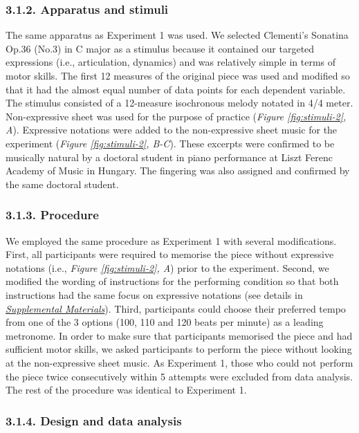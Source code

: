 \documentclass[
  english,
  man,floatsintext]{apa6}
\begin{document}
\hypertarget{apparatus-and-stimuli-1}{%
\subsubsection{3.1.2. Apparatus and stimuli}\label{apparatus-and-stimuli-1}}

The same apparatus as Experiment 1 was used. We selected Clementi's Sonatina Op.36 (No.3) in C major as a stimulus because it contained our targeted expressions (i.e., articulation, dynamics) and was relatively simple in terms of motor skills. The first 12 measures of the original piece was used and modified so that it had the almost equal number of data points for each dependent variable. The stimulus consisted of a 12-measure isochronous melody notated in 4/4 meter. Non-expressive sheet was used for the purpose of practice (\emph{Figure \ref{fig:stimuli-2}, A}). Expressive notations were added to the non-expressive sheet music for the experiment (\emph{Figure \ref{fig:stimuli-2}, B-C}). These excerpts were confirmed to be musically natural by a doctoral student in piano performance at Liszt Ferenc Academy of Music in Hungary. The fingering was also assigned and confirmed by the same doctoral student.

\hypertarget{procedure-2}{%
\subsubsection{3.1.3. Procedure}\label{procedure-2}}

We employed the same procedure as Experiment 1 with several modifications. First, all participants were required to memorise the piece without expressive notations (i.e., \emph{Figure \ref{fig:stimuli-2}, A}) prior to the experiment. Second, we modified the wording of instructions for the performing condition so that both instructions had the same focus on expressive notations (see details in \emph{\protect\hyperlink{supplemental}{Supplemental Materials}}). Third, participants could choose their preferred tempo from one of the 3 options (100, 110 and 120 beats per minute) as a leading metronome. In order to make sure that participants memorised the piece and had sufficient motor skills, we asked participants to perform the piece without looking at the non-expressive sheet music. As Experiment 1, those who could not perform the piece twice consecutively within 5 attempts were excluded from data analysis. The rest of the procedure was identical to Experiment 1.

\hypertarget{design-and-data-analysis-1}{%
\subsubsection{3.1.4. Design and data analysis}\label{design-and-data-analysis-1}}
\end{document}
